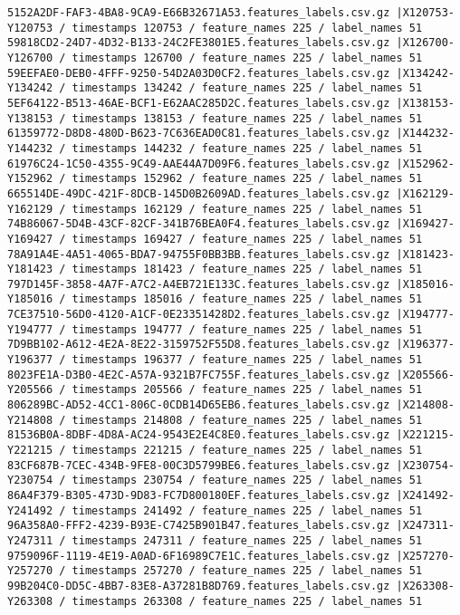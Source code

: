 \documentclass{UoNMCHA}
\numberwithin{equation}{section}
\begin{document}
\begin{lstlisting}
5152A2DF-FAF3-4BA8-9CA9-E66B32671A53.features_labels.csv.gz |X120753-Y120753 / timestamps 120753 / feature_names 225 / label_names 51
59818CD2-24D7-4D32-B133-24C2FE3801E5.features_labels.csv.gz |X126700-Y126700 / timestamps 126700 / feature_names 225 / label_names 51
59EEFAE0-DEB0-4FFF-9250-54D2A03D0CF2.features_labels.csv.gz |X134242-Y134242 / timestamps 134242 / feature_names 225 / label_names 51
5EF64122-B513-46AE-BCF1-E62AAC285D2C.features_labels.csv.gz |X138153-Y138153 / timestamps 138153 / feature_names 225 / label_names 51
61359772-D8D8-480D-B623-7C636EAD0C81.features_labels.csv.gz |X144232-Y144232 / timestamps 144232 / feature_names 225 / label_names 51
61976C24-1C50-4355-9C49-AAE44A7D09F6.features_labels.csv.gz |X152962-Y152962 / timestamps 152962 / feature_names 225 / label_names 51
665514DE-49DC-421F-8DCB-145D0B2609AD.features_labels.csv.gz |X162129-Y162129 / timestamps 162129 / feature_names 225 / label_names 51
74B86067-5D4B-43CF-82CF-341B76BEA0F4.features_labels.csv.gz |X169427-Y169427 / timestamps 169427 / feature_names 225 / label_names 51
78A91A4E-4A51-4065-BDA7-94755F0BB3BB.features_labels.csv.gz |X181423-Y181423 / timestamps 181423 / feature_names 225 / label_names 51
797D145F-3858-4A7F-A7C2-A4EB721E133C.features_labels.csv.gz |X185016-Y185016 / timestamps 185016 / feature_names 225 / label_names 51
7CE37510-56D0-4120-A1CF-0E23351428D2.features_labels.csv.gz |X194777-Y194777 / timestamps 194777 / feature_names 225 / label_names 51
7D9BB102-A612-4E2A-8E22-3159752F55D8.features_labels.csv.gz |X196377-Y196377 / timestamps 196377 / feature_names 225 / label_names 51
8023FE1A-D3B0-4E2C-A57A-9321B7FC755F.features_labels.csv.gz |X205566-Y205566 / timestamps 205566 / feature_names 225 / label_names 51
806289BC-AD52-4CC1-806C-0CDB14D65EB6.features_labels.csv.gz |X214808-Y214808 / timestamps 214808 / feature_names 225 / label_names 51
81536B0A-8DBF-4D8A-AC24-9543E2E4C8E0.features_labels.csv.gz |X221215-Y221215 / timestamps 221215 / feature_names 225 / label_names 51
83CF687B-7CEC-434B-9FE8-00C3D5799BE6.features_labels.csv.gz |X230754-Y230754 / timestamps 230754 / feature_names 225 / label_names 51
86A4F379-B305-473D-9D83-FC7D800180EF.features_labels.csv.gz |X241492-Y241492 / timestamps 241492 / feature_names 225 / label_names 51
96A358A0-FFF2-4239-B93E-C7425B901B47.features_labels.csv.gz |X247311-Y247311 / timestamps 247311 / feature_names 225 / label_names 51
9759096F-1119-4E19-A0AD-6F16989C7E1C.features_labels.csv.gz |X257270-Y257270 / timestamps 257270 / feature_names 225 / label_names 51
99B204C0-DD5C-4BB7-83E8-A37281B8D769.features_labels.csv.gz |X263308-Y263308 / timestamps 263308 / feature_names 225 / label_names 51

\end{lstlisting}
\end{document}
